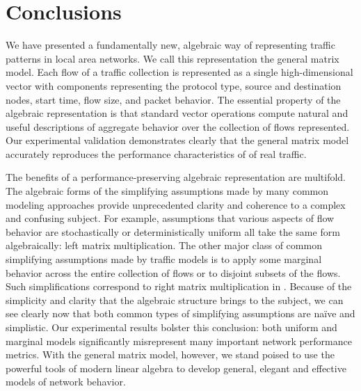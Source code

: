 \documentclass[twocolumn,final]{svjour3}
\begin{document}


\section{Conclusions}\label{sec:conclusions}

We have presented a fundamentally new, algebraic way of representing traffic patterns in local area networks. We call this representation the general matrix model. Each flow of a traffic collection is represented as a single high-dimensional vector with components representing the  protocol type, source and destination nodes, start time, flow size, and packet behavior. The essential property of the algebraic representation is that standard vector operations compute natural and useful descriptions of aggregate behavior over the collection of flows represented. Our experimental validation demonstrates clearly that the general matrix model accurately reproduces the performance characteristics of of real traffic.

The benefits of a performance-preserving algebraic representation are multifold. The algebraic forms of the simplifying assumptions made by many common modeling approaches provide unprecedented clarity and coherence to a complex and confusing subject. For example, assumptions that various aspects of flow behavior are stochastically or deterministically uniform all take the same form algebraically: left matrix multiplication. The other major class of common simplifying assumptions made by traffic models is to apply some marginal behavior across the entire collection of flows or to disjoint subsets of the flows. Such simplifications correspond to right matrix multiplication in . Because of the simplicity and clarity that the algebraic structure brings to the subject, we can see clearly now that both common types of simplifying assumptions are na\"ive and simplistic. Our experimental results bolster this conclusion: both uniform and marginal models significantly misrepresent many important network performance metrics. With the general matrix model, however, we stand poised to use the powerful tools of modern linear algebra to develop general, elegant and effective models of network behavior.




\end{document}
